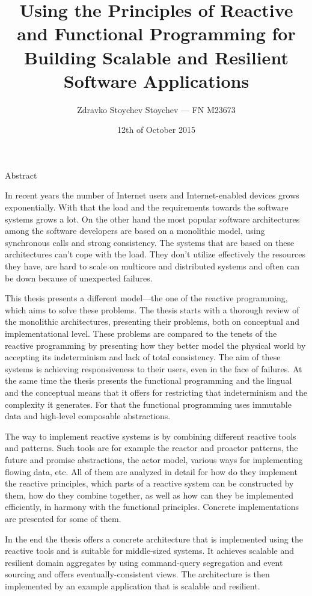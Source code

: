 \documentclass[a4paper, 12pt]{article}
\title{Using the Principles of Reactive and Functional Programming for Building Scalable and Resilient Software Applications}
\author{Zdravko Stoychev Stoychev — FN M23673}
\date{12th of October 2015}
\begin{document}
  \maketitle
  
  \begin{center}
    \large Abstract
    \vspace{0.2em}
  \end{center}

  In recent years the number of Internet users and Internet-enabled devices grows exponentially. With that the load and the requirements towards the software systems grows a lot. On the other hand the most popular software architectures among the software developers are based on a monolithic model, using synchronous calls and strong consistency. The systems that are based on these architectures can’t cope with the load. They don’t utilize effectively the resources they have, are hard to scale on multicore and distributed systems and often can be down because of unexpected failures.
  
  This thesis presents a different model—the one of the reactive programming, which aims to solve these problems. The thesis starts with a thorough review of the monolithic architectures, presenting their problems, both on conceptual and implementational level. These problems are compared to the tenets of the reactive programming by presenting how they better model the physical world by accepting its indeterminism and lack of total consistency. The aim of these systems is achieving responsiveness to their users, even in the face of failures. At the same time the thesis presents the functional programming and the lingual and the conceptual means that it offers for restricting that indeterminism and the complexity it generates. For that the functional programming uses immutable data and high-level composable abstractions.
  
  The way to implement reactive systems is by combining different reactive tools and patterns. Such tools are for example the reactor and proactor patterns, the future and promise abstractions, the actor model, various ways for implementing flowing data, etc. All of them are analyzed in detail for how do they implement the reactive principles, which parts of a reactive system can be constructed by them, how do they combine together, as well as how can they be implemented efficiently, in harmony with the functional principles. Concrete implementations are presented for some of them.
  
  In the end the thesis offers a concrete architecture that is implemented using the reactive tools and is suitable for middle-sized systems. It achieves scalable and resilient domain aggregates by using command-query segregation and event sourcing and offers eventually-consistent views. The architecture is then implemented by an example application that is scalable and resilient.
\end{document}
